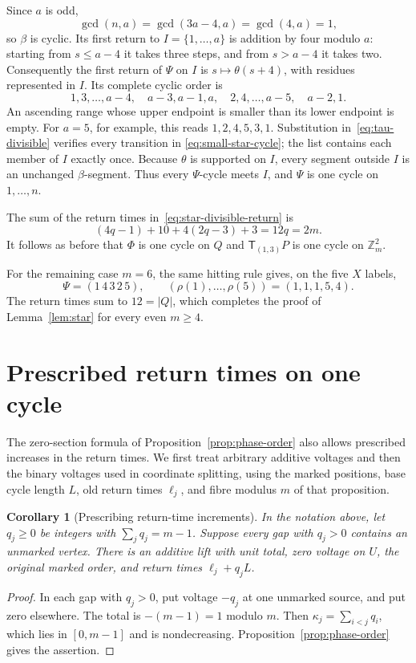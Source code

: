\documentclass[11pt,reqno]{amsart}
\numberwithin{equation}{section}
\newtheorem{corollary}[theorem]{Corollary}
\theoremstyle{definition}
\theoremstyle{remark}
\newcommand{\Zm}{\mathbb Z_m}
\newcommand{\tr}{\mathsf T}
\begin{document}
Since $a$ is odd,
\[
 \gcd(n,a)=\gcd(3a-4,a)=\gcd(4,a)=1,
\]
so $\beta$ is cyclic. Its first return to $I=\{1,\ldots,a\}$ is addition by four
modulo $a$: starting from $s\le a-4$ it takes three steps, and from $s>a-4$ it
takes two. Consequently the first return of $\Psi$ on $I$ is
$s\mapsto\theta(s+4)$, with residues represented in $I$. Its complete cyclic
order is
\begin{equation}\label{eq:small-star-cycle}
 1,3,\ldots,a-4,\quad
 a-3,a-1,a,\quad
 2,4,\ldots,a-5,\quad
 a-2,1.
\end{equation}
An ascending range whose upper endpoint is smaller than its lower endpoint is
empty. For $a=5$, for example, this reads $1,2,4,5,3,1$.
Substitution in~\eqref{eq:tau-divisible} verifies every transition in
\eqref{eq:small-star-cycle}; the list contains each member of $I$ exactly once.
Because $\theta$ is supported on $I$, every segment outside $I$ is an unchanged
$\beta$-segment. Thus every $\Psi$-cycle meets $I$, and $\Psi$ is one cycle on
$1,\ldots,n$.

The sum of the return times in~\eqref{eq:star-divisible-return} is
\[
 (4q-1)+10+4(2q-3)+3=12q=2m.
\]
It follows as before that $\Phi$ is one cycle on $Q$ and $\tr_{(1,3)}P$ is one
cycle on $\Zm^2$.

For the remaining case $m=6$, the same hitting rule gives, on the five $X$ labels,
\[
 \Psi=(1\,4\,3\,2\,5),\qquad
 (\rho(1),\ldots,\rho(5))=(1,1,1,5,4).
\]
The return times sum to $12=|Q|$, which completes the proof of
Lemma~\ref{lem:star} for every even $m\ge4$.

\section{Prescribed return times on one cycle}\label{app:capacity}
The zero-section formula of Proposition~\ref{prop:phase-order} also
allows prescribed increases in the return times. We first treat
arbitrary additive voltages and then the binary voltages used in
coordinate splitting, using the marked positions, base cycle length
$L$, old return times $\ell_j$, and fibre modulus $m$ of that proposition.

\begin{corollary}[Prescribing return-time increments]\label{cor:budget-realization}
In the notation above, let $q_j\ge0$ be integers with $\sum_jq_j=m-1$.
Suppose every gap with $q_j>0$ contains an unmarked vertex. There is an
additive lift with unit total, zero voltage on $U$, the original marked
order, and return times $\ell_j+q_jL$.
\end{corollary}
\begin{proof}
In each gap with $q_j>0$, put voltage $-q_j$ at one unmarked source,
and put zero elsewhere. The total is $-(m-1)=1$ modulo $m$.
Then $\kappa_j=\sum_{i<j}q_i$, which lies in $[0,m-1]$ and is
nondecreasing. Proposition~\ref{prop:phase-order} gives the assertion.
\end{proof}
\end{document}
